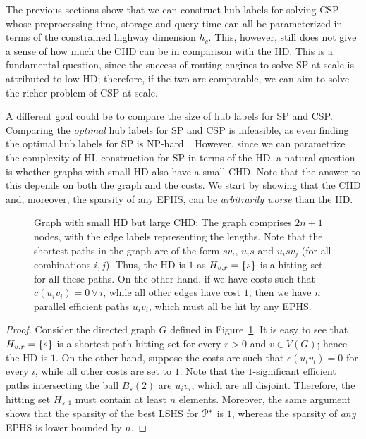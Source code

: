 The previous sections show that we can construct hub labels for solving CSP whose preprocessing time, storage and query time can all be parameterized in terms of the constrained highway dimension $h_c$. 
This, however, still does not give a sense of how much the CHD can be in comparison with the HD. 
This is a fundamental question, since the success of routing engines to solve SP at scale is attributed to low HD; therefore, if the two are comparable, we can aim to solve the richer problem of CSP at scale.

A different goal could be to compare the size of hub labels for SP and CSP.
Comparing the \emph{optimal} hub labels for SP and CSP is infeasible, as even finding the optimal hub labels for SP is NP-hard~\citep{babenko_hl_complexity}. 
However, since we can parametrize the complexity of HL construction for SP in terms of the HD, a natural question is whether graphs with small HD also have a small CHD. 
Note that the answer to this depends on both the graph and the costs.
We start by showing that the CHD and, moreover, the sparsity of any EPHS, can be \emph{arbitrarily worse} than the HD. 
\begin{figure}

\caption{Graph with small HD but large CHD: The graph comprises $2n+1$ nodes, with the edge labels representing the lengths. Note that the shortest paths in the graph are of the form $sv_i$, $u_is$ and $u_isv_j$ (for all combinations $i,j$). Thus, the HD is $1$ as $H_{v,r}=\{s\}$ is a hitting set for all these paths. On the other hand, if we have costs such that $c(u_iv_i)=0\,\forall\,i$, while all other edges have cost $1$, then we have $n$ parallel efficient paths $u_iv_i$, which must all be hit by any EPHS.}
\label{fig:big_chd}
\end{figure}
\begin{proof}
Consider the directed graph $G$ defined in Figure~\ref{fig:big_chd}.
It is easy to see that $H_{v,r}=\{s\}$ is a shortest-path hitting set for every $r>0$ and $v\in V(G)$; hence the HD is $1$.
On the other hand, suppose the costs are such that $c(u_iv_i)=0$ for every $i$, while all other costs are set to $1$.
Note that the $1$-significant efficient paths intersecting the ball $B_s(2)$ are $u_iv_i$, which are all disjoint.
Therefore, the hitting set $H_{s,1}$ must contain at least $n$ elements. 
Moreover, the same argument shows that the sparsity of the best LSHS for $\mathcal{P}^*$ is $1$, whereas the sparsity of \emph{any} EPHS is lower bounded by $n$.
\end{proof}

